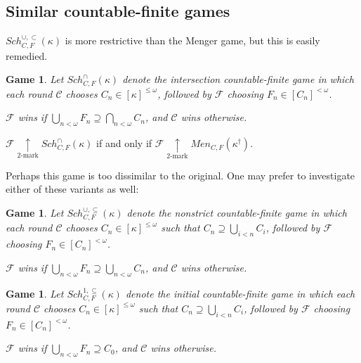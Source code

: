 \documentclass{beamer}
\theoremstyle{example}
\newtheorem{game}[theorem]{Game}
\theoremstyle{definition}
\newcommand{\kmarkwin}[1]{\underset{#1\text{-mark}}{\uparrow}}
\newcommand{\oneptlind}[1]{#1^\dagger} %
\newcommand{\menGame}[1]{Men_{C,F}\left({#1}\right)}
\newcommand{\schFillStrictGame}[1]{Sch^{\cup,\subset}_{C,F}\left({#1}\right)}
\newcommand{\schFillGame}[1]{Sch^{\cup,\subseteq}_{C,F}\left({#1}\right)}
\newcommand{\schFillInitialGame}[1]{Sch^{1,\subseteq}_{C,F}\left({#1}\right)}
\newcommand{\schFillIntGame}[1]{Sch^{\cap}_{C,F}\left({#1}\right)}
\newcommand{\<}{\langle}
\renewcommand{\>}{\rangle}
\newcommand{\pl}[1]{\mathscr{#1}}
\newcommand{\term}{\textit}
\begin{document}
\subsection{Similar countable-finite games}

\begin{frame}
  \(\schFillStrictGame\kappa\) is more restrictive than the Menger game,
  but this is easily remedied.

  \begin{game}
    Let \(\schFillIntGame\kappa\) denote the
    \term{intersection countable-finite game}
    in which each round \(\pl C\) chooses \(C_n\in[\kappa]^{\leq\omega}\),
    followed by \(\pl F\) choosing \(F_n\in[C_n]^{<\omega}\).

    \(\pl F\) wins if \(\bigcup_{n<\omega}F_n\supseteq \bigcap_{n<\omega}C_n\),
    and \(\pl C\) wins otherwise.
  \end{game}

  \pause

  \begin{theorem}
    \(\pl F\kmarkwin{2}\schFillIntGame\kappa\) if and only if
    \(\pl F\kmarkwin{2}\menGame{\oneptlind\kappa}\).
  \end{theorem}
\end{frame}

\begin{frame}
  Perhaps this game is too dissimilar to the original. One may prefer
  to investigate either of these variants as well:

  \pause

  \begin{game}
    Let \(\schFillGame\kappa\) denote the
    \term{nonstrict countable-finite game}
    in which each round \(\pl C\) chooses \(C_n\in[\kappa]^{\leq\omega}\)
    such that \(C_n\supseteq \bigcup_{i<n}C_i\),
    followed by \(\pl F\) choosing \(F_n\in[C_n]^{<\omega}\).

    \(\pl F\) wins if \(\bigcup_{n<\omega}F_n\supseteq \bigcup_{n<\omega}C_n\),
    and \(\pl C\) wins otherwise.
  \end{game}

  \begin{game}
    Let \(\schFillInitialGame\kappa\) denote the
    \term{initial countable-finite game}
    in which each round \(\pl C\) chooses \(C_n\in[\kappa]^{\leq\omega}\)
    such that \(C_n\supseteq \bigcup_{i<n}C_i\),
    followed by \(\pl F\) choosing \(F_n\in[C_n]^{<\omega}\).

    \(\pl F\) wins if \(\bigcup_{n<\omega}F_n\supseteq C_0\),
    and \(\pl C\) wins otherwise.
  \end{game}
\end{frame}
\end{document}
